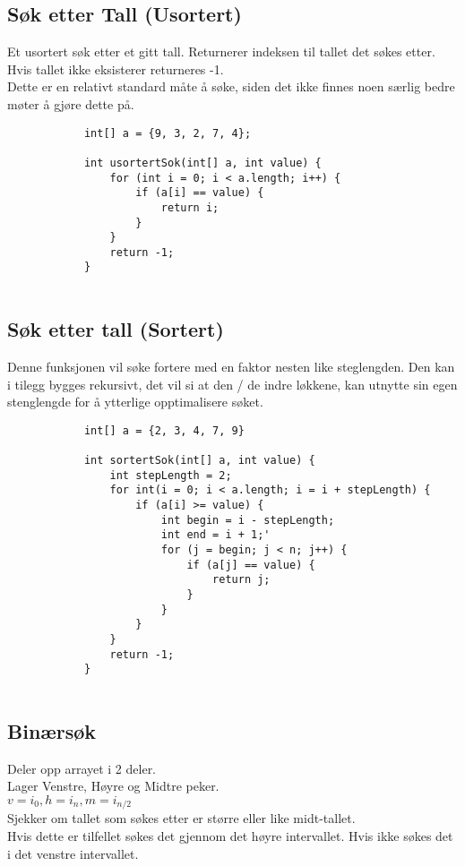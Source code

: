 \documentclass[11pt]{article}
\begin{document}
\subsection{Søk etter Tall (Usortert)}
Et usortert søk etter et gitt tall.	Returnerer indeksen til tallet det søkes etter.
Hvis tallet ikke eksisterer returneres -1.\\
Dette er en relativt standard måte å søke, siden det ikke finnes noen særlig bedre møter å gjøre dette på.


\begin{lstlisting}
			int[] a = {9, 3, 2, 7, 4};

			int usortertSok(int[] a, int value) {
				for (int i = 0; i < a.length; i++) {
					if (a[i] == value) {
						return i;
					}
				}
				return -1;
			}
		
		\end{lstlisting}

\subsection{Søk etter tall (Sortert)}

Denne funksjonen vil søke fortere med en faktor nesten like steglengden.
Den kan i tilegg bygges rekursivt, det vil si at den / de indre løkkene,
kan utnytte sin egen stenglengde for å ytterlige opptimalisere søket.
\begin{lstlisting}
			int[] a = {2, 3, 4, 7, 9}

			int sortertSok(int[] a, int value) {
				int stepLength = 2;
				for int(i = 0; i < a.length; i = i + stepLength) {
					if (a[i] >= value) {
						int begin = i - stepLength;
						int end = i + 1;'
						for (j = begin; j < n; j++) {
							if (a[j] == value) {
								return j;
							}
						}
					}
				}
				return -1;
			}
		
		\end{lstlisting}

\subsection{Binærsøk}
Deler opp arrayet i 2 deler. \\
Lager Venstre, Høyre og Midtre peker.\\
$v = i_0, h = i_n, m = i_{n/2}$\\

Sjekker om tallet som søkes etter er større eller like midt-tallet. \\
Hvis dette er tilfellet søkes det gjennom det høyre intervallet.
Hvis ikke søkes det i det venstre intervallet. \\
\end{document}
